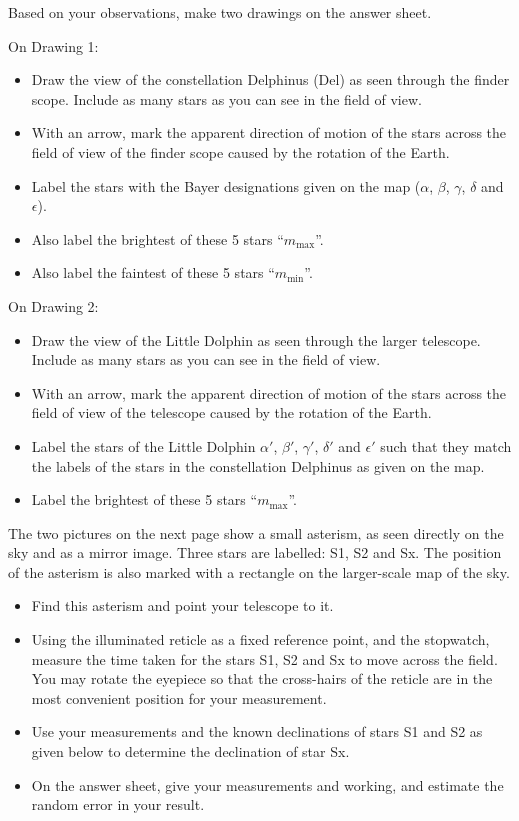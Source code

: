 Based on your observations, make two drawings on the answer sheet.

On Drawing 1:
\begin{itemize}
\item Draw the view of the constellation Delphinus (Del) as seen through the
  finder scope. Include as many stars as you can see in the field of view.
\item With an arrow, mark the apparent direction of motion of the stars across
  the field of view of the finder scope caused by the rotation of the Earth.
\item Label the stars with the Bayer designations given on the map ($\alpha$,
  $\beta$, $\gamma$, $\delta$ and $\epsilon$).
\item Also label the brightest of these 5 stars ``$m_{\max}$''.
\item Also label the faintest of these 5 stars ``$m_{\min}$''.
\end{itemize}

On Drawing 2:
\begin{itemize}
\item Draw the view of the Little Dolphin as seen through the larger
  telescope. Include as many stars as you can see in the field of view.
\item With an arrow, mark the apparent direction of motion of the stars across
  the field of view of the telescope caused by the rotation of the Earth.
\item Label the stars of the Little Dolphin $\alpha'$, $\beta'$, $\gamma'$,
  $\delta'$ and $\epsilon'$ such that they match the labels of the stars in
  the constellation Delphinus as given on the map.
\item Label the brightest of these 5 stars ``$m_{\max}$''.
\end{itemize}

The two pictures on the next page show a small asterism, as seen directly on
the sky and as a mirror image. Three stars are labelled: S1, S2 and Sx. The
position of the asterism is also marked with a rectangle on the larger-scale
map of the sky.


\begin{itemize}
\item Find this asterism and point your telescope to it.
\item Using the illuminated reticle as a fixed reference point, and the
  stopwatch, measure the time taken for the stars S1, S2 and Sx to move across
  the field. You may rotate the eyepiece so that the cross-hairs of the
  reticle are in the most convenient position for your measurement.
\item Use your measurements and the known declinations of stars S1 and S2 as
  given below to determine the declination of star Sx.
\item On the answer sheet, give your measurements and working, and estimate
  the random error in your result.
\end{itemize}

